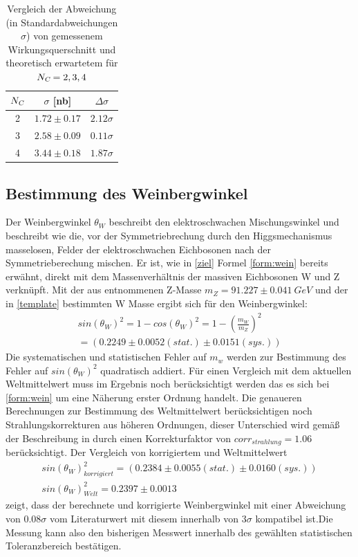\documentclass[a4paper,12pt]{article}
\begin{document}
\begin{table}[h]
	\centering
	\begin{tabular}{c| c |c }
		$N_{\textsl{C}}$ & $\sigma$ [nb] &$\Delta\sigma$ \\
		\hline
		2 &  $1.72 \pm 0.17$ & $2.12\sigma$ \\
		3 &  $2.58 \pm 0.09$ & $0.11\sigma$ \\
		4 &  $3.44 \pm 0.18$ & $1.87\sigma$ \\
	\end{tabular}
	\caption{Vergleich der Abweichung (in Standardabweichungen $\sigma$) von gemessenem Wirkungsquerschnitt und theoretisch erwartetem für $N_{\textsl{C}}= 2,3,4$}
	\label{tab:color}
\end{table}


\subsection{Bestimmung des Weinbergwinkel}
Der Weinbergwinkel $\theta_{W}$ beschreibt den elektroschwachen Mischungswinkel und beschreibt wie
die, vor der Symmetriebrechung durch den Higgsmechanismus masselosen, Felder der elektroschwachen Eichbosonen nach der Symmetrieberechung
mischen. Er ist, wie in \ref{ziel} Formel \ref{form:wein} bereits erwähnt, direkt mit dem Massenverhältnis der massiven Eichbosonen W und Z verknüpft.
Mit der aus \cite{versuchsanleitung} entnommenen Z-Masse $m_{Z}=91.227 \pm \SI{0.041}{GeV}$ und der in \ref{template} bestimmten W Masse ergibt
sich für den Weinbergwinkel:
\begin{align*}
	sin\left(\theta_{W}\right)^{2} = 1 - cos\left(\theta_{W}\right)^{2} = 1 - \left(\frac{m_{W}}{m_{Z}}\right)^{2} \\ = ( 0.2249 ± 0.0052 (stat.) ± 0.0151(sys.))
\end{align*}
Die systematischen und statistischen Fehler auf $m_{w}$ werden zur Bestimmung des Fehler auf $sin(\theta_{W})^{2}$ quadratisch addiert.
Für einen Vergleich mit dem aktuellen Weltmittelwert muss im Ergebnis noch berücksichtigt werden das es sich bei \ref{form:wein} um eine
Näherung erster Ordnung handelt. Die genaueren Berechnungen zur Bestimmung des Weltmittelwert berücksichtigen noch Strahlungskorrekturen aus höheren
Ordnungen, dieser Unterschied wird gemäß der Beschreibung in \cite{versuchsanleitung} durch einen Korrekturfaktor von $corr_{strahlung}=1.06$
berücksichtigt. Der Vergleich von korrigiertem und Weltmittelwert
\begin{align*}
	sin(\theta_{W})_{korrigiert}^{2} = ( 0.2384 ± 0.0055 (stat.) ± 0.0160(sys.)) \\ 
	sin(\theta_{W})_{Welt}^{2} = 0.2397 \pm 0.0013
\end{align*}
zeigt, dass der berechnete und korrigierte Weinbergwinkel mit einer Abweichung von $0.08\sigma$ vom Literaturwert mit diesem
innerhalb von $3\sigma$ kompatibel ist.Die Messung kann also den bisherigen Messwert innerhalb des gewählten statistischen
Toleranzbereich bestätigen.
\end{document}
